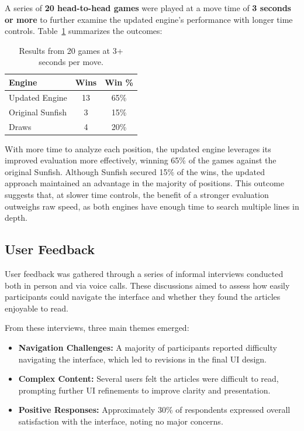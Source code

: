 \documentclass[12pt,a4paper]{article}
\begin{document}
A series of \textbf{20 head-to-head games} were played at a move time of \textbf{3 seconds or more} to further examine the updated engine’s performance with longer time controls. Table~\ref{tab:extended_results} summarizes the outcomes:

\begin{table}[ht]
\centering
\begin{tabular}{lcc}
\hline
\textbf{Engine} & \textbf{Wins} & \textbf{Win \%} \\
\hline
Updated Engine   & 13 & 65\% \\
Original Sunfish & 3  & 15\% \\
Draws            & 4  & 20\% \\
\hline
\end{tabular}
\caption{Results from 20 games at 3+ seconds per move.}
\label{tab:extended_results}
\end{table}

With more time to analyze each position, the updated engine leverages its improved evaluation more effectively, winning 65\% of the games against the original Sunfish. Although Sunfish secured 15\% of the wins, the updated approach maintained an advantage in the majority of positions. This outcome suggests that, at slower time controls, the benefit of a stronger evaluation outweighs raw speed, as both engines have enough time to search multiple lines in depth.

\subsection{User Feedback}

User feedback was gathered through a series of informal interviews conducted both in person and via voice calls. These discussions aimed to assess how easily participants could navigate the interface and whether they found the articles enjoyable to read.

From these interviews, three main themes emerged:
\begin{itemize}
    \item \textbf{Navigation Challenges:} A majority of participants reported difficulty navigating the interface, which led to revisions in the final UI design.
    \item \textbf{Complex Content:} Several users felt the articles were difficult to read, prompting further UI refinements to improve clarity and presentation.
    \item \textbf{Positive Responses:} Approximately 30\% of respondents expressed overall satisfaction with the interface, noting no major concerns.
\end{itemize}
\end{document}
